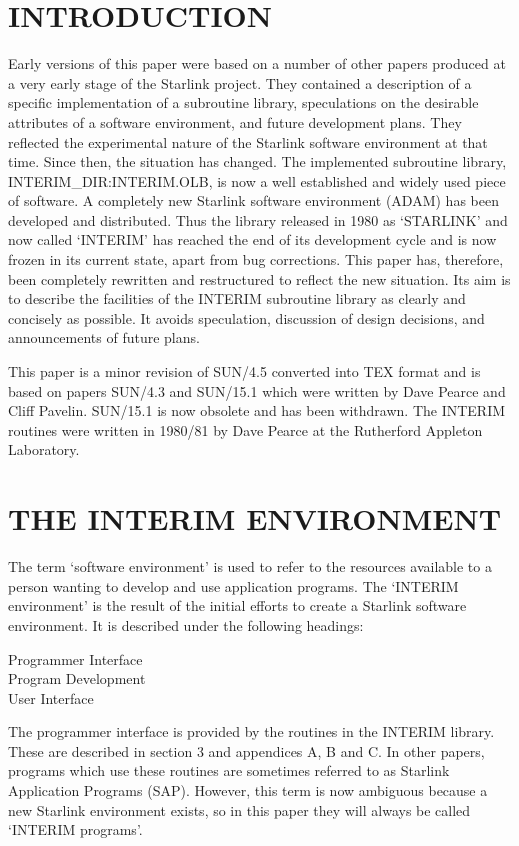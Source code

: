 \section {INTRODUCTION}
Early versions of this paper were based on a number of other papers produced
at a very early stage of the Starlink project.
They contained a description of a specific implementation of a subroutine
library, speculations on the desirable attributes of a software environment,
and future development plans.
They reflected the experimental nature of the Starlink software environment
at that time.
Since then, the situation has changed.
The implemented subroutine library, INTERIM\_DIR:INTERIM.OLB, is now a well
established and widely used piece of software.
A completely new Starlink software environment (ADAM) has been developed and
distributed.
Thus the library released in 1980 as `STARLINK' and now called `INTERIM' has
reached the end of its development cycle and is now frozen in its current state,
apart from bug corrections.
This paper has, therefore, been completely rewritten and restructured to reflect
the new situation.
Its aim is to describe the facilities of the INTERIM subroutine library as
clearly and concisely as possible.
It avoids speculation, discussion of design decisions, and announcements of
future plans.

This paper is a minor revision of SUN/4.5 converted into TEX format and is based
on papers SUN/4.3 and SUN/15.1 which were written by Dave Pearce and Cliff
Pavelin.
SUN/15.1 is now obsolete and has been withdrawn.
The INTERIM routines were written in 1980/81 by Dave Pearce at the Rutherford
Appleton Laboratory.
\section {THE INTERIM ENVIRONMENT}
The term `software environment' is used to refer to the resources available
to a person wanting to develop and use application programs.
The `INTERIM environment' is the result of the initial efforts to create a
Starlink software environment.
It is described under the following headings:
\begin{description}
\begin{description}
\item [Programmer Interface]
\item [Program Development]
\item [User Interface]
\end{description}
\end{description}
The programmer interface is provided by the routines in the INTERIM library.
These are described in section 3 and appendices A, B and C.
In other papers, programs which use these routines are sometimes referred to as
Starlink Application Programs (SAP).
However, this term is now ambiguous because a new Starlink environment
exists, so in this paper they will always be called `INTERIM programs'.

